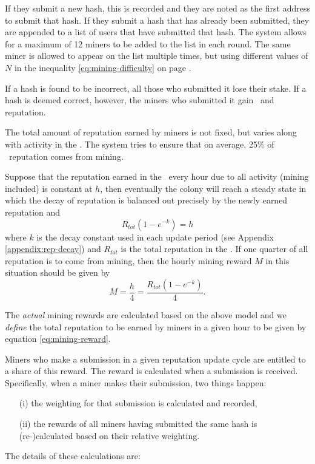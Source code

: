 If they submit a new hash, this is recorded and they are noted as the first address to submit that hash. If they submit a hash that has already been submitted, they are appended to a list of users that have submitted that hash. The system allows for a maximum of 12 miners to be added to the list in each round. The same miner is allowed to appear on the list multiple times, but using different values of $N$ in the inequality \eqref{eq:mining-difficulty} on page \pageref{eq:mining-difficulty}.

If a hash is found to be incorrect, all those who submitted it lose their stake. If a hash is deemed correct, however, the miners who submitted it gain \rcts\ and reputation. 

The total amount of reputation earned by miners is not fixed, but varies along with activity in the \rc. The system tries to ensure that on average, 25\% of \rc\ reputation comes from mining. %

Suppose that the reputation earned in the \rc\ every hour due to all activity (mining included) is constant at $h$, then eventually the colony will reach a steady state in which the decay of reputation is balanced out precisely by the newly earned reputation and
\begin{equation}
 R_{tot} \left( 1 - e^{-k} \right) = h
\end{equation}
\noindent where $k$ is the decay constant used in each update period (see Appendix \ref{appendix:rep-decay}) and $R_{tot}$ is the total reputation in the \rc. If one quarter of all reputation is to come from mining, then the hourly mining reward $M$ in this situation should be given by
\begin{equation}\label{eq:mining-reward}
 M = \frac{h}{4} = \frac{R_{tot} \left( 1 - e^{-k} \right)}{4}.
\end{equation}

The \emph{actual} mining rewards are calculated based on the above model and we \emph{define} the total reputation to be earned by miners in a given hour to be given by equation \eqref{eq:mining-reward}.

Miners who make a submission in a given reputation update cycle are entitled to a share of this reward. The reward is calculated when a submission is received. Specifically, when a miner makes their submission, two things happen:
\begin{itemize}
 \item[(i)] the weighting for that submission is calculated and recorded,
 \item[(ii)] the rewards of all miners having submitted the same hash is (re-)calculated based on their relative weighting.
\end{itemize}
\noindent The details of these calculations are:\\

